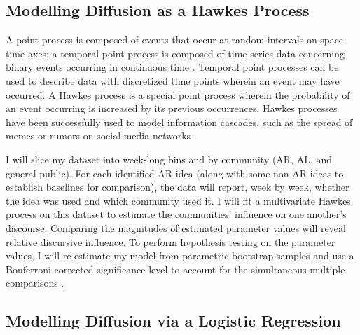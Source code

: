\documentclass[acmlarge, screen, authorversion]{acmart}
\begin{document}
\subsection{Modelling Diffusion as a Hawkes Process}

A point process is composed of events that occur at random intervals on
space-time axes; a temporal point process is composed of time-series data
concerning binary events occurring in continuous time
\cite{daleyIntroductionTheoryPoint2003, ogataSpaceTimePointProcessModels1998}.
Temporal point processes can be used to describe data with discretized time
points wherein an event may have occurred. A Hawkes process is a special point
process wherein the probability of an event occurring is increased by its
previous occurrences. Hawkes processes have been successfully used to model
information cascades, such as the spread of memes or rumors on social media
networks
\cite{luoMultiTaskMultiDimensionalHawkes2015,lukasikHawkesProcessesContinuous2016}.

I will slice my dataset into week-long bins and by community (AR, AL, and general
public). For each identified AR idea (along with some non-AR ideas to establish baselines for comparison), the data
will report, week by week, whether the idea was used and which community used
it. I will fit a multivariate Hawkes process on this dataset to estimate the
communities' influence on one another's discourse. Comparing the magnitudes of
estimated parameter values will reveal relative discursive influence. To perform
hypothesis testing on the parameter values, I will re-estimate my model from
parametric bootstrap samples \cite{reinhartReviewSelfExcitingSpatioTemporal2018}
and use a Bonferroni-corrected significance level to account for the
simultaneous multiple comparisons \cite{tanEffectWordingMessage2014}.

%

\subsection{Modelling Diffusion via a Logistic Regression}
\end{document}
